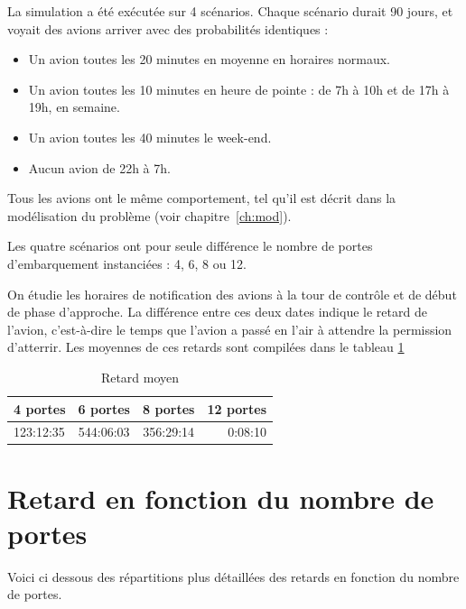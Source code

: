 
La simulation a été exécutée sur 4 scénarios. Chaque scénario durait 90 jours, et voyait des avions arriver avec des probabilités identiques :
\begin{itemize}
  \item Un avion toutes les 20 minutes en moyenne en horaires normaux.
  \item Un avion toutes les 10 minutes en heure de pointe : de 7h à 10h et de 17h à 19h, en semaine.
  \item Un avion toutes les 40 minutes le week-end.
  \item Aucun avion de 22h à 7h.
\end{itemize}
Tous les avions ont le même comportement, tel qu'il est décrit dans la modélisation du problème (voir chapitre~\ref{ch:mod}).

Les quatre scénarios ont pour seule différence le nombre de portes d'embarquement instanciées : 4, 6, 8 ou 12.

On étudie les horaires de notification des avions à la tour de contrôle et de début de phase d'approche. La différence entre ces deux dates indique le retard de l'avion, c'est-à-dire le temps que l'avion a passé en l'air à attendre la permission d'atterrir. Les moyennes de ces retards sont compilées dans le tableau \ref{retard_moyen}

\begin{table}[H]
\begin{center}
\begin{tabular}{|l|c|c|r|}
  \hline
  4 portes & 6 portes & 8 portes & 12 portes \\
  \hline
  123:12:35 & 544:06:03 & 356:29:14 & 0:08:10\\
  \hline
\end{tabular}
   \caption{\label{retard_moyen} Retard moyen}
\end{center}
\end{table}

\section{Retard en fonction du nombre de portes}
Voici ci dessous des répartitions plus détaillées des retards en fonction du nombre de portes.

